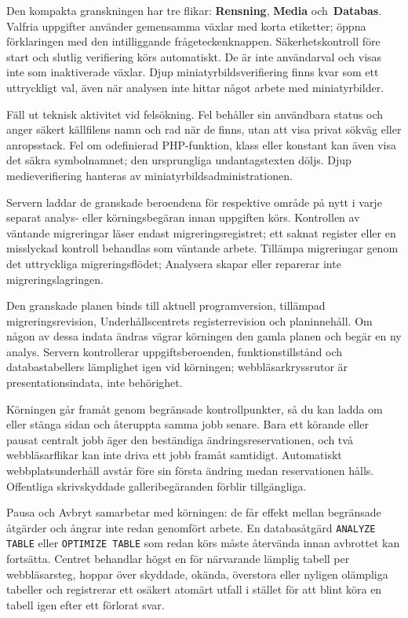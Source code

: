 \documentclass[11pt,a4paper]{article}
\newcommand{\ui}[1]{\textbf{#1}}
\newcommand{\codeword}[1]{\nolinkurl{#1}}
\begin{document}
Den kompakta granskningen har tre flikar: \ui{Rensning}, \ui{Media}
och~\ui{Databas}.
Valfria uppgifter använder gemensamma växlar med korta etiketter; öppna
förklaringen med den intilliggande frågeteckenknappen. Säkerhetskontroll före
start och slutlig verifiering körs automatiskt. De är inte användarval och
visas inte som inaktiverade växlar. Djup miniatyrbildsverifiering finns kvar
som ett uttryckligt val, även när analysen inte hittar något arbete med
miniatyrbilder.

Fäll ut teknisk aktivitet vid felsökning. Fel behåller sin användbara status
och anger säkert källfilens namn och rad när de finns, utan att visa privat
sökväg eller anropsstack. Fel om odefinierad PHP-funktion, klass eller konstant
kan även visa det säkra symbolnamnet; den ursprungliga undantagstexten döljs.
Djup medieverifiering hanteras av miniatyrbildsadministrationen.

Servern laddar de granskade beroendena för respektive område på nytt i varje
separat analys- eller körningsbegäran innan uppgiften körs. Kontrollen av
väntande migreringar läser endast migreringsregistret; ett saknat register eller
en misslyckad kontroll behandlas som väntande arbete. Tillämpa migreringar genom
det uttryckliga migreringsflödet; Analysera skapar eller reparerar inte
migreringslagringen.

Den granskade planen binds till aktuell programversion, tillämpad
migreringsrevision, Underhållscentrets registerrevision och planinnehåll. Om
någon av dessa indata ändras vägrar körningen den gamla planen och begär en ny
analys. Servern kontrollerar uppgiftsberoenden, funktionstillstånd och
databastabellers lämplighet igen vid körningen; webbläsarkryssrutor är
presentationsindata, inte behörighet.

Körningen går framåt genom begränsade kontrollpunkter, så du kan ladda om eller
stänga sidan och återuppta samma jobb senare. Bara ett körande eller pausat
centralt jobb äger den beständiga ändringsreservationen, och två webbläsarflikar
kan inte driva ett jobb framåt samtidigt. Automatiskt webbplatsunderhåll avstår
före sin första ändring medan reservationen hålls. Offentliga skrivskyddade
galleribegäranden förblir tillgängliga.

Pausa och Avbryt samarbetar med körningen: de får effekt mellan begränsade
åtgärder och ångrar inte redan genomfört arbete. En databasåtgärd
\codeword{ANALYZE TABLE} eller \codeword{OPTIMIZE TABLE} som redan körs måste
återvända innan avbrottet kan fortsätta. Centret behandlar högst en för
närvarande lämplig tabell per webbläsarsteg, hoppar över skyddade, okända,
överstora eller nyligen olämpliga tabeller och registrerar ett osäkert atomärt
utfall i stället för att blint köra en tabell igen efter ett förlorat svar.
\end{document}
